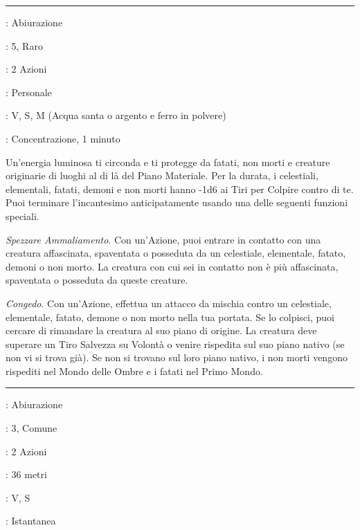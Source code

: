 \begin{multicols}{2}
\smallskip\noindent\rule{\linewidth}{2pt} \hypertarget{Dissolvi il Bene e il Male}{}\medskip{}
\noindent
\begin{description}[noitemsep, topsep=0pt, parsep=0pt, partopsep=0pt, leftmargin=0cm, labelwidth=2.8cm]
	\item[\textbf{Lista di Magia}]: Abiurazione
	\item[\textbf{Livello}]: 5, Raro
	\item[\textbf{T. di Lancio}]: 2 Azioni
	\item[\textbf{Gittata}]: Personale
	\item[\textbf{Componenti}]: V, S, M (Acqua santa o argento e ferro in polvere)
	\item[\textbf{Durata}]: Concentrazione, 1 minuto
\end{description}

Un'energia luminosa ti circonda e ti protegge da fatati, non morti e creature originarie di luoghi al di là del Piano Materiale. Per la durata, i celestiali, elementali, fatati, demoni e non morti hanno -1d6 ai Tiri per Colpire contro di te. Puoi terminare l'incantesimo anticipatamente usando una delle seguenti funzioni speciali.

\emph{Spezzare Ammaliamento}. Con un'Azione, puoi entrare in contatto con una creatura affascinata, spaventata o posseduta da un celestiale, elementale, fatato, demoni o non morto. La creatura con cui sei in contatto non è più affascinata, spaventata o posseduta da queste creature.

\emph{Congedo}. Con un'Azione, effettua un attacco da mischia contro un celestiale, elementale, fatato, demone o non morto nella tua portata. Se lo colpisci, puoi cercare di rimandare la creatura al suo piano di origine. La creatura deve superare un Tiro Salvezza su Volontà o venire rispedita sul suo piano nativo (se non vi si trova già). Se non si trovano sul loro piano nativo, i non morti vengono rispediti nel Mondo delle Ombre e i fatati nel Primo Mondo.

\smallskip\noindent\rule{\linewidth}{2pt} \hypertarget{Dissolvi Magie}{}\medskip{}\hypertarget{dissolvimagie}{}
\noindent
\begin{description}[noitemsep, topsep=0pt, parsep=0pt, partopsep=0pt, leftmargin=0cm, labelwidth=2.8cm]
	\item[\textbf{Lista di Magia}]: Abiurazione
	\item[\textbf{Livello}]: 3, Comune
	\item[\textbf{T. di Lancio}]: 2 Azioni
	\item[\textbf{Gittata}]: 36 metri
	\item[\textbf{Componenti}]: V, S
	\item[\textbf{Durata}]: Istantanea
\end{description}


\end{multicols}
